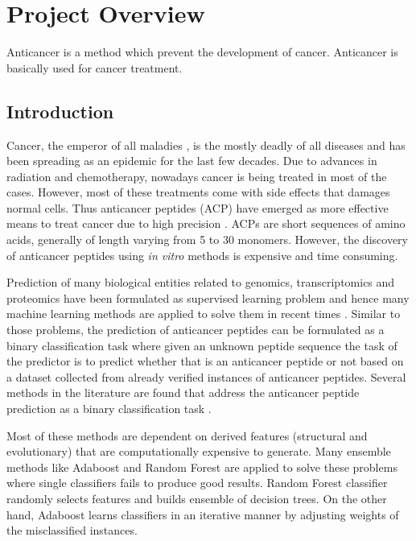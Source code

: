 

\chapter{Project Overview}
\ifpdf
    \graphicspath{{chapter_1/figures/PNG/}{chapter_1/figures/PDF/}{chapter_1/figures/}}
\else
    \graphicspath{{chapter_1/figures/EPS/}{chapter_1/figures/}}
\fi
Anticancer is a method which prevent the development of cancer. Anticancer is basically used for cancer treatment.

\section{Introduction}
Cancer, the emperor of all maladies \cite{mukherjee2010emperor}, is the mostly deadly of all diseases and has been spreading as an epidemic for the last few decades. Due to advances in radiation and chemotherapy, nowadays cancer is being treated in most of the cases. However, most of these treatments come with side effects that damages normal cells. Thus anticancer peptides (ACP) have emerged as more effective means to treat cancer due to high precision \cite{otvos2008peptide}. ACPs are short sequences of amino acids, generally of length varying from 5 to 30 monomers. However, the discovery of anticancer peptides using \textit{in vitro} methods is expensive and time consuming. 


Prediction of many biological entities related to genomics, transcriptomics and proteomics have been formulated as supervised learning problem and hence many machine learning methods are applied to solve them in recent times \cite{chou2011some,jani2018irecspot,rayhan2018cfsboost,rahman2018ipromoter,chowdhury2017idnaprot}. Similar to those problems, the prediction of anticancer peptides can be formulated as a binary classification task where given an unknown peptide sequence the task of the predictor is to predict whether that is an anticancer peptide or not based on a dataset collected from already verified instances of anticancer peptides. Several methods in the literature are found that address the anticancer peptide prediction as a binary classification task \cite{tyagi2013silico,vijayakumar2015acpp,hajisharifi2014predicting,chen2016iacp,wei2018acpred}. 


Most of these methods are dependent on derived features (structural and evolutionary) that are computationally expensive to generate. Many ensemble methods like Adaboost \cite{rayhan2018cfsboost} and Random Forest \cite{jani2018irecspot} are applied to solve these problems where single classifiers fails to produce good results. Random Forest classifier randomly selects features and builds ensemble of decision trees. On the other hand, Adaboost  learns classifiers in an iterative manner by adjusting weights of the misclassified instances.

